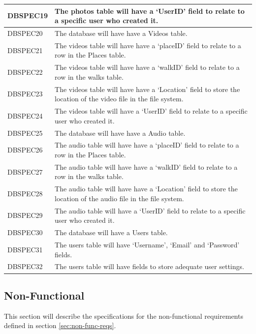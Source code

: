\documentclass[11pt,a4paper]{article}
\begin{document}
\begin{longtable}{|p{2.5cm}p{13cm}|}
DBSPEC19 & The photos table will have a `UserID' field to relate to a specific user who created it. \\\hline
DBSPEC20 & The database will have have a Videos table. \\ \hline
DBSPEC21 & The videos table will have have a `placeID' field to relate to a row in the Places table. \\ \hline
DBSPEC22 & The videos table will have have a `walkID' field to relate to a row in the walks table.\\ \hline
DBSPEC23 & The videos table will have have a `Location' field to store the location of the video file in the file system.\\ \hline
DBSPEC24 & The videos table will have a `UserID' field to relate to a specific user who created it. \\\hline
DBSPEC25 & The database will have have a Audio table. \\ \hline
DBSPEC26 & The audio table will have have a `placeID' field to relate to a row in the Places table. \\ \hline
DBSPEC27 & The audio table will have have a `walkID' field to relate to a row in the walks table.\\ \hline
DBSPEC28 & The audio table will have have a `Location' field to store the location of the audio file in the file system.\\ \hline
DBSPEC29 & The audio table will have a `UserID' field to relate to a specific user who created it. \\\hline
DBSPEC30 & The database will have a Users table. \\ \hline
DBSPEC31 & The users table will have `Username', `Email' and `Password' fields.\\ \hline
DBSPEC32 & The users table will have fields to store adequate user settings. \\ \hline



\end{longtable}

\subsection{Non-Functional}
\label{sec:non-func-specs}

This section will describe the specifications for the non-functional requirements defined in section \ref{sec:non-func-reqs}.
\end{document}
